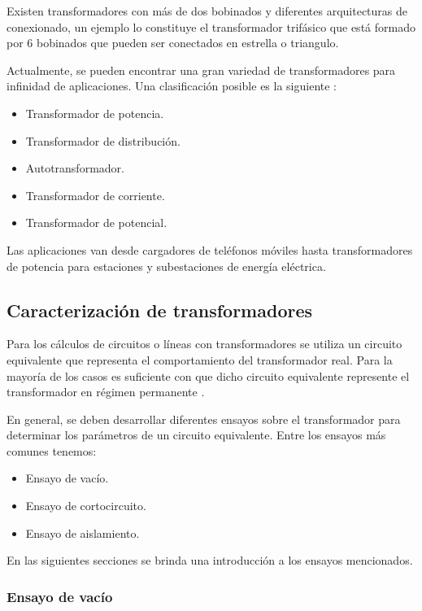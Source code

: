 
Existen transformadores con más de dos bobinados y diferentes arquitecturas de conexionado, un ejemplo lo constituye el transformador trifásico que está formado por 6 bobinados que pueden ser conectados en estrella o triangulo.

Actualmente, se pueden encontrar una gran variedad de transformadores para infinidad de aplicaciones. Una clasificación posible es la siguiente \citep{TRAFO_APL}:

\begin{itemize}
\item Transformador de potencia.
\item Transformador de distribución.
\item Autotransformador.
\item Transformador de corriente.
\item Transformador de potencial.
\end{itemize}

Las aplicaciones van desde cargadores de teléfonos móviles hasta transformadores de potencia para estaciones y subestaciones de energía eléctrica.

\subsection{Caracterización de transformadores}

Para los cálculos de circuitos o líneas con transformadores se utiliza un circuito equivalente que representa el comportamiento del transformador real. Para la mayoría de los casos es suficiente con que dicho circuito equivalente represente el transformador en régimen permanente \citep{TRAFO_WIKI}. 

En general, se deben desarrollar diferentes ensayos sobre el transformador para determinar los parámetros de un circuito equivalente. Entre los ensayos más comunes tenemos:

\begin{itemize}
\item Ensayo de vacío.
\item Ensayo de cortocircuito.
\item Ensayo de aislamiento.
\end{itemize}

En las siguientes secciones se brinda una introducción a los ensayos mencionados.

\subsubsection{Ensayo de vacío}

